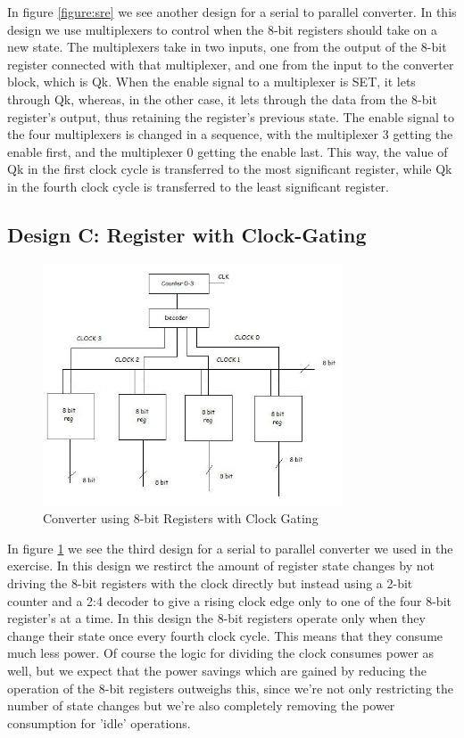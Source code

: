 \documentclass[11pt,a4paper]{article}
\begin{document}
In figure \ref{figure:sre} we see another design for a serial to parallel converter. In this design we use multiplexers to control when the 8-bit registers should take on a new state. The multiplexers take in two inputs, one from the output of the 8-bit register connected with that multiplexer, and one from the input to the converter block, which is Qk. When the enable signal to a multiplexer is SET, it lets through Qk, whereas, in the other case, it lets through the data from the 8-bit register's output, thus retaining the register's previous state. The enable signal to the four multiplexers is changed in a sequence, with the multiplexer 3 getting the enable first, and the multiplexer 0 getting the enable last. This way, the value of Qk in the first clock cycle is transferred to the most significant register, while Qk in the fourth clock cycle is transferred to the least significant register.
\

\subsection{Design C: Register with Clock-Gating}

\begin{figure}[htp]
\centering
\includegraphics[width = 3.5in]{./images/shiftregistergated.jpg}
\caption{Converter using 8-bit Registers with Clock Gating}
\label{figure:srg}
\end{figure}

In figure \ref{figure:srg} we see the third design for a serial to parallel converter we used in the exercise. In this design we restirct the amount of register state changes by not driving the 8-bit registers with the clock directly but instead using a 2-bit counter and a 2:4 decoder to give a rising clock edge only to one of the four 8-bit register's at a time. In this design the 8-bit registers operate only when they change their state once every fourth clock cycle. This means that they consume much less power. Of course the logic for dividing the clock consumes power as well, but we expect that the power savings which are gained by reducing the operation of the 8-bit registers outweighs this, since we're not only restricting the number of state changes but we're also completely removing the power consumption for 'idle' operations.
\end{document}
